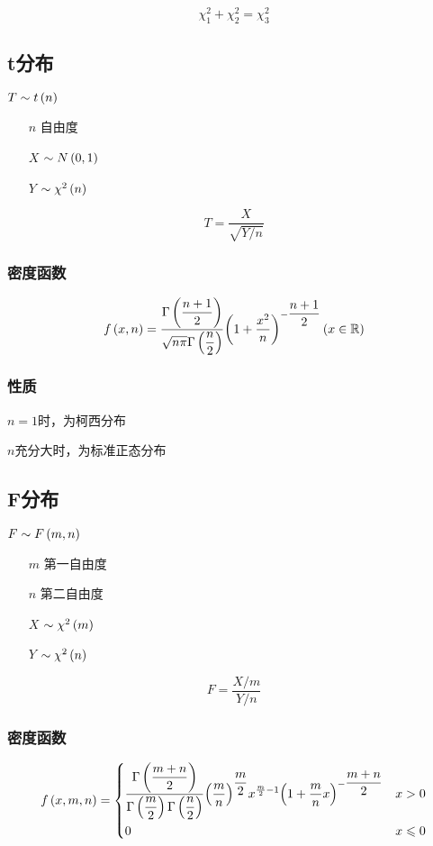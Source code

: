 \documentclass{article}
\begin{document}
\[\chi_1^2+\chi_2^2=\chi_3^2\]

\subsection{t分布}

$T\sim t\left(n\right)$

\begin{enumerate}
    \item [$n$] 自由度
    \item [$X$] $\sim N\left(0,1\right)$
    \item [$Y$] $\sim\chi^2\left(n\right)$
\end{enumerate}

\[T=\frac{X}{\sqrt{Y/n}}\]

\subsubsection{密度函数}

\[f\left(x,n\right)=\frac{\Gamma\left(\dfrac{n+1}2\right)}{\sqrt{n\pi}\Gamma\left(\dfrac n2\right)}{\left(1+\frac{x^2}n\right)}^{-\dfrac{n+1}2}\left(x\in\mathbb R\right)\]

\subsubsection{性质}

$n=1$时，为柯西分布

$n$充分大时，为标准正态分布

\subsection{F分布}

$F\sim F\left(m,n\right)$

\begin{enumerate}
    \item [$m$] 第一自由度
    \item [$n$] 第二自由度
    \item [$X$] $\sim\chi^2\left(m\right)$
    \item [$Y$] $\sim\chi^2\left(n\right)$
\end{enumerate}

\[F=\frac{X/m}{Y/n}\]

\subsubsection{密度函数}

\[f\left(x,m,n\right)=
    \left\{\begin{aligned}
         & \frac{\Gamma\left(\dfrac{m+n}2\right)}{\Gamma\left(\dfrac m2\right)\Gamma\left(\dfrac n2\right)}{\left(\frac mn\right)}^{\dfrac m2}x^{\frac m2-1}{\left(1+\frac mnx\right)}^{-\dfrac{m+n}2} &  & x>0         \\
         & 0                                                                                                                                              &  & x\leqslant0 \\
    \end{aligned}\right.\]
\end{document}
